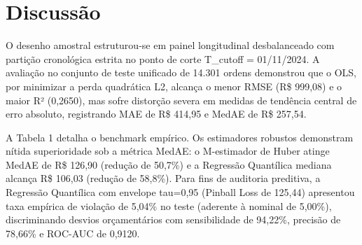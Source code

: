\documentclass[12pt,a4paper]{article}
\begin{document}
\section{Discussão}

O desenho amostral estruturou-se em painel longitudinal desbalanceado com partição cronológica estrita no ponto de corte T\_cutoff = 01/11/2024. A avaliação no conjunto de teste unificado de 14.301 ordens demonstrou que o OLS, por minimizar a perda quadrática L2, alcança o menor RMSE (R\$ 999,08) e o maior R² (0,2650), mas sofre distorção severa em medidas de tendência central de erro absoluto, registrando MAE de R\$ 414,95 e MedAE de R\$ 257,54.

A Tabela 1 detalha o benchmark empírico. Os estimadores robustos demonstram nítida superioridade sob a métrica MedAE: o M-estimador de Huber atinge MedAE de R\$ 126,90 (redução de 50,7\%) e a Regressão Quantílica mediana alcança R\$ 106,03 (redução de 58,8\%). Para fins de auditoria preditiva, a Regressão Quantílica com envelope tau=0,95 (Pinball Loss de 125,44) apresentou taxa empírica de violação de 5,04\% no teste (aderente à nominal de 5,00\%), discriminando desvios orçamentários com sensibilidade de 94,22\%, precisão de 78,66\% e ROC-AUC de 0,9120.



\begin{table}[htbp]
\centering
\small
{}
\end{table}
\end{document}
